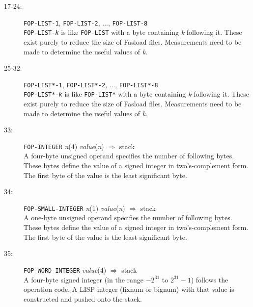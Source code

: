 \begin{description}
\item[17-24:] \hspace{2em} {\tt FOP-LIST-1}, {\tt FOP-LIST-2}, ..., {\tt FOP-LIST-8} \\
{\tt FOP-LIST-{\it k}} is like {\tt FOP-LIST} with a byte containing {\it k}
following it.  These exist purely to reduce the size of Fasload files.
Measurements need to be made to determine the useful values of {\it k}.

\item[25-32:] \hspace{2em} {\tt FOP-LIST*-1}, {\tt FOP-LIST*-2}, ..., {\tt FOP-LIST*-8} \\
{\tt FOP-LIST*-{\it k}} is like {\tt FOP-LIST*} with a byte containing {\it k}
following it.  These exist purely to reduce the size of Fasload files.
Measurements need to be made to determine the useful values of {\it k}.

\item[33:] \hspace{2em} {\tt FOP-INTEGER} \hspace{2em} {\it n}(4) \hspace{2em} {\it value}({\it n}) \hspace{2em}
$\Rightarrow$ \hspace{2em} stack \\
A four-byte unsigned operand specifies the number of following
bytes.	These bytes define the value of a signed integer in two's-complement
form.  The first byte of the value is the least significant byte.

\item[34:] \hspace{2em} {\tt FOP-SMALL-INTEGER} \hspace{2em} {\it n}(1) \hspace{2em} {\it value}({\it n})
\hspace{2em} $\Rightarrow$ \hspace{2em} stack \\
A one-byte unsigned operand specifies the number of following
bytes.	These bytes define the value of a signed integer in two's-complement
form.  The first byte of the value is the least significant byte.

\item[35:] \hspace{2em} {\tt FOP-WORD-INTEGER} \hspace{2em} {\it value}(4) \hspace{2em} $\Rightarrow$ \hspace{2em} stack \\
A four-byte signed integer (in the range $-2^{31}$ to $2^{31}-1$) follows the
operation code.  A LISP integer (fixnum or bignum) with that value
is constructed and pushed onto the stack.


\end{description}
